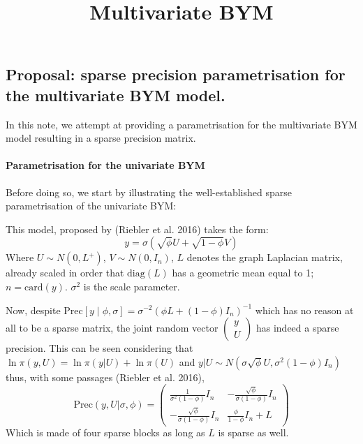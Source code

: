\documentclass[
]{article}
\title{Multivariate BYM}
\author{}
\date{\vspace{-2.5em}}
\begin{document}
\maketitle

\subsection{Proposal: sparse precision parametrisation for the
multivariate BYM
model.}\label{proposal-sparse-precision-parametrisation-for-the-multivariate-bym-model.}

In this note, we attempt at providing a parametrisation for the
multivariate BYM model resulting in a sparse precision matrix.

\paragraph{Parametrisation for the univariate
BYM}\label{parametrisation-for-the-univariate-bym}

Before doing so, we start by illustrating the well-established sparse
parametrisation of the univariate BYM:

This model, proposed by (Riebler et al. 2016) takes the form: \[
y = \sigma\left( \sqrt{\phi} U + \sqrt{1-\phi}V\right)
\] Where \(U \sim N(0, L^{+})\), \(V \sim N(0, I_{n})\), \(L\) denotes
the graph Laplacian matrix, already scaled in order that
\(\mathrm{diag}(L)\) has a geometric mean equal to 1;
\(n = \mathrm{card}(y)\). \(\sigma^2\) is the scale parameter.

Now, despite
\(\mathrm{Prec}[y \mid \phi, \sigma] =  \sigma^{-2}\left( \phi L + (1-\phi)I_n \right)^{-1}\)
which has no reason at all to be a sparse matrix, the joint random
vector \(\begin{pmatrix} y \\ U\end{pmatrix}\) has indeed a sparse
precision. This can be seen considering that
\(\ln \pi(y, U) = \ln \pi(y | U) + \ln \pi(U)\) and
\(y|U \sim N(\sigma\sqrt{\phi}U, \sigma^2(1-\phi) I_n)\) thus, with some
passages (Riebler et al. 2016), \begin{equation}
\mathrm{Prec}(y, U | \sigma, \phi) = \begin{pmatrix} 
\frac{1}{\sigma^2 (1 - \phi)} I_n & - \frac{\sqrt{\phi}}{\sigma(1-\phi)} I_n \\
- \frac{\sqrt{\phi}}{\sigma(1-\phi)} I_n  & \frac{\phi}{1-\phi}I_n + L
\end{pmatrix}
\label{eq:joint_sparse_uni}
\end{equation} Which is made of four sparse blocks as long as \(L\) is
sparse as well.
\end{document}
